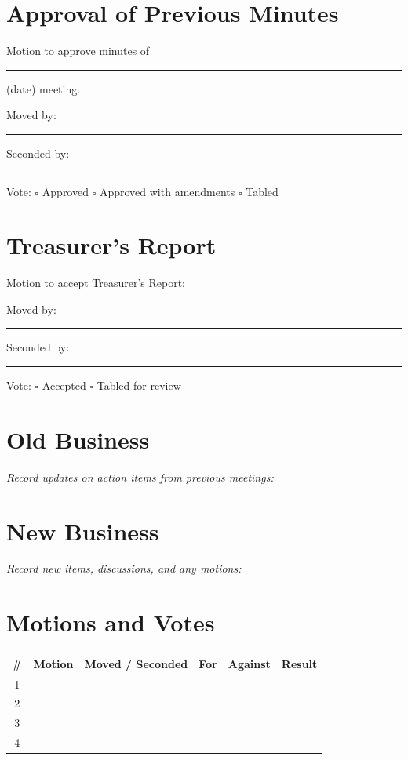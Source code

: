 \documentclass[11pt, letterpaper]{article}
\begin{document}

\section{Approval of Previous Minutes}

\noindent Motion to approve minutes of \rule{4cm}{0.4pt} (date) meeting.
\vspace{0.3em}

\noindent Moved by: \rule{5cm}{0.4pt} \hfill Seconded by: \rule{5cm}{0.4pt}

\noindent Vote: \quad $\square$ Approved \quad $\square$ Approved with amendments \quad $\square$ Tabled

\section{Treasurer's Report}


\noindent Motion to accept Treasurer's Report:

\noindent Moved by: \rule{5cm}{0.4pt} \hfill Seconded by: \rule{5cm}{0.4pt}

\noindent Vote: \quad $\square$ Accepted \quad $\square$ Tabled for review

\section{Old Business}

\noindent\textit{Record updates on action items from previous meetings:}
\vspace{3cm}

\section{New Business}

\noindent\textit{Record new items, discussions, and any motions:}
\vspace{3cm}

\section{Motions and Votes}

\begin{center}
\begin{tabularx}{\textwidth}{|c|X|X|c|c|c|}
\hline
\rowcolor{afp-teal!10}
\textbf{\#} & \textbf{Motion} & \textbf{Moved / Seconded} & \textbf{For} & \textbf{Against} & \textbf{Result} \\
\hline
1 & & & & & \\[1.2cm] \hline
2 & & & & & \\[1.2cm] \hline
3 & & & & & \\[1.2cm] \hline
4 & & & & & \\[1.2cm] \hline
\end{tabularx}
\end{center}
\end{document}
